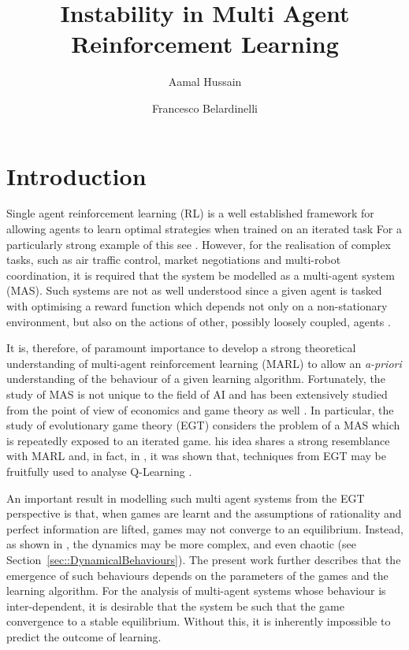 \documentclass[sigconf,anonymous]{aamas}
\title[InstabilityinMARL]{Instability in Multi Agent Reinforcement Learning}
\author{Aamal Hussain}
\affiliation{
  \department{Department of Computing}
  \institution{Imperial College London}}
\author{Francesco Belardinelli}
\affiliation{
  \department{Department of Computing}
  \institution{Imperial College London}}
\begin{document}

\pagestyle{fancy}
\fancyhead{}


\maketitle 


\section{Introduction}

Single agent reinforcement learning (RL) is a well established framework for allowing agents to learn optimal strategies when trained on an iterated task 
For a particularly strong example of this see \cite{Vinyals2019}. However, for the realisation of complex tasks, such as air traffic control, market negotiations and multi-robot coordination, it is required that the system be modelled as a multi-agent system (MAS). Such systems are not as well understood since a given agent is tasked with optimising a reward function which depends not only on a non-stationary environment, but also on the actions of other, possibly loosely coupled, agents \cite{SchwartzMulti-agentApproach}. 

It is, therefore, of paramount importance to develop a strong theoretical understanding of multi-agent reinforcement learning (MARL) to allow an {\em a-priori} understanding of the behaviour of a given learning algorithm. Fortunately, the study of MAS is not unique to the field of AI and has been extensively studied from the point of view of economics and game theory as well \cite{ShohamMultiagentFoundations}. In particular, the study of evolutionary game theory (EGT) considers the problem of a MAS which is repeatedly exposed to an iterated game. 
his idea shares a strong resemblance with MARL and, in fact, in \cite{Tuyls2006AnGames}, it was shown that, techniques from EGT may be fruitfully used to analyse Q-Learning \cite{Sutton2018}.

An important result in modelling such multi agent systems from the EGT perspective is that, when games are learnt and the assumptions of rationality and perfect information are lifted, games may not converge to an equilibrium. Instead, as shown in \cite{Sanders2018}, the dynamics may be more complex, and even chaotic (see Section~\ref{sec::DynamicalBehaviours}). The present work further describes that the emergence of such behaviours depends on the parameters of the games and the learning algorithm. For the analysis of multi-agent systems whose behaviour is inter-dependent, it is desirable that the system be such that the game convergence to a stable equilibrium. Without this, it is inherently impossible to predict the outcome of learning.  
\end{document}
